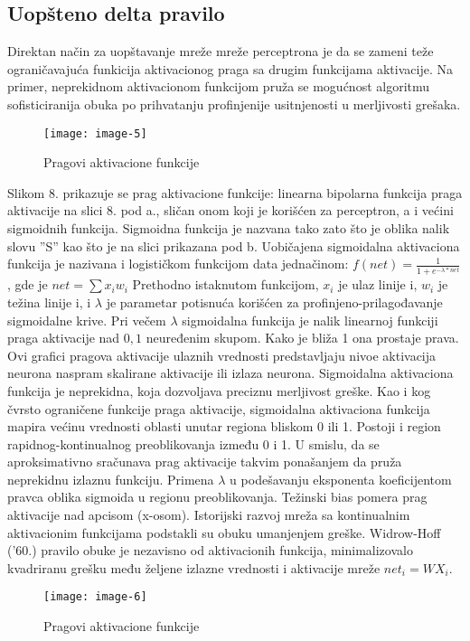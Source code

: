 \documentclass[fontsize=11bp, paper=a4]{scrarticle}
\begin{document}
\subsection{Uopšteno delta pravilo}

Direktan način za uopštavanje mreže mreže perceptrona je da se zameni teže ograničavajuća funkicija aktivacionog praga sa drugim funkcijama aktivacije. Na primer, neprekidnom aktivacionom funkcijom pruža se mogućnost algoritmu sofisticiranija obuka po prihvatanju profinjenije usitnjenosti u merljivosti grešaka.
\begin{figure}[h!]
    \centering
    \texttt{[image: image-5]}
    \caption{Pragovi aktivacione funkcije}
\end{figure}
Slikom 8. prikazuje se prag aktivacione funkcije: linearna bipolarna funkcija praga aktivacije na slici 8. pod a., sličan onom koji je korišćen za perceptron, a i većini sigmoidnih funkcija. Sigmoidna funkcija je nazvana tako zato što je oblika nalik slovu ''S'' kao što je na slici prikazana pod b. Uobičajena sigmoidalna aktivaciona funkcija je nazivana i logističkom funkcijom data jednačinom: $f(net) = \frac{1}{1+e^{-\lambda*net}}$, gde je $net = \sum x_i w_i$
Prethodno istaknutom funkcijom, $x_i$ je ulaz linije i, $w_i$ je težina linije i, i $\lambda$ je parametar potisnuća korišćen za profinjeno-prilagođavanje sigmoidalne krive. Pri večem $\lambda$ sigmoidalna funkcija je nalik linearnoj funkciji praga aktivacije nad ${0,1}$ neuređenim skupom. Kako je bliža 1 ona prostaje prava. Ovi grafici pragova aktivacije ulaznih vrednosti predstavljaju nivoe aktivacija neurona naspram skalirane aktivacije ili izlaza neurona. Sigmoidalna aktivaciona funkcija je neprekidna, koja dozvoljava preciznu merljivost greške. Kao i kog čvrsto ograničene funkcije praga aktivacije, sigmoidalna aktivaciona funkcija mapira većinu vrednosti oblasti unutar regiona bliskom 0 ili 1. Postoji i region rapidnog-kontinualnog preoblikovanja između 0 i 1. U smislu, da se aproksimativno sračunava prag aktivacije takvim ponašanjem da pruža neprekidnu izlaznu funkciju. Primena $\lambda$ u podešavanju eksponenta koeficijentom pravca oblika sigmoida u regionu preoblikovanja. Težinski bias pomera prag aktivacije nad apcisom (x-osom). Istorijski razvoj mreža sa kontinualnim aktivacionim funkcijama podstakli su obuku umanjenjem greške. Widrow-Hoff ('60.) pravilo obuke je nezavisno od aktivacionih funkcija, minimalizovalo kvadriranu grešku među željene izlazne vrednosti i aktivacije mreže $net_i = WX_i$. 
\begin{figure}[h!]
    \centering
    \texttt{[image: image-6]}
    \caption{Pragovi aktivacione funkcije}
\end{figure}
\end{document}
